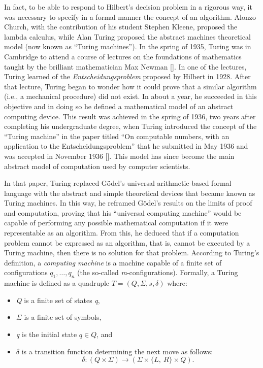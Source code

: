 In fact, to be able to respond to Hilbert's decision problem in a rigorous way, it was necessary to specify in a formal manner the concept of an algorithm. Alonzo Church, with the contribution of his student Stephen Kleene, proposed the lambda calculus, while Alan Turing proposed the abstract machines theoretical model (now known as ``Turing machines''). In the spring of 1935, Turing was in \hbox{Cambridge} to attend a course of lectures on the foundations of mathematics taught by the brilliant mathematician Max Newman [\citealt{chap:02:Davis:2012}]. In one of the lectures, Turing learned of the \textit{Entscheidungsproblem} proposed by Hilbert in 1928. After that lecture, Turing began to wonder how it could prove that a similar algorithm (i.e., a mechanical procedure) did not exist. In about a year, he succeeded in this objective and in doing so he defined a mathematical model of an abstract computing device. This result was achieved in the spring of 1936, two years after completing his undergraduate degree, when Turing introduced the concept of the ``Turing machine'' in the paper titled ``On computable numbers, with an application to the Entscheidungsproblem'' that he submitted in May 1936 and was accepted in November 1936 [\citealt{chap:02:Turing:1937}]. This model has since become the main abstract model of computation used by computer scientists.

In that paper, Turing replaced G\"{o}del's universal arithmetic-based formal language with the abstract and simple theoretical devices that became known as Turing machines. In this way, he reframed G\"{o}del's results on the limits of proof and computation, proving that his ``universal computing machine'' would be capable of performing any possible mathematical computation if it were representable as an algorithm. From this, he deduced that if a computation problem cannot be expressed as an algorithm, that is, cannot be executed by a Turing machine, then there is no solution for that problem. According to Turing's definition, a \textit{computing machine} is a machine capable of a finite set of configurations $q_{1},\ldots ,q_{n}$ (the so-called \textit{m}-configurations). Formally, a Turing machine is defined as a quadruple $T = (Q, \Sigma , s, \delta )$ where:

\begin{itemize}
\item \textit{Q} is a finite set of states \textit{q},

\item $\Sigma $ is a finite set of symbols,

\item \textit{q} is the initial state $q\in Q$, and

\item $\delta$ is a transition function determining the next move as follows:
\begin{equation*}
\delta :(Q \times \Sigma )\to (\Sigma  \times  \{ L,\ R\}  \times Q).
\end{equation*}
\end{itemize}

